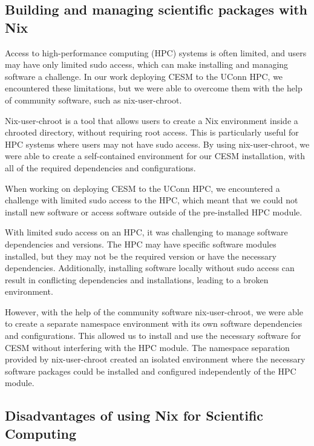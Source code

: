 \documentclass[
]{article}
\begin{document}
\hypertarget{building-and-managing-scientific-packages-with-nix}{%
\subsection{Building and managing scientific packages with Nix}\label{building-and-managing-scientific-packages-with-nix}}

Access to high-performance computing (HPC) systems is often limited, and users may have only limited sudo access, which can make installing and managing software a challenge. In our work deploying CESM to the UConn HPC, we encountered these limitations, but we were able to overcome them with the help of community software, such as nix-user-chroot.

Nix-user-chroot is a tool that allows users to create a Nix environment inside a chrooted directory, without requiring root access. This is particularly useful for HPC systems where users may not have sudo access. By using nix-user-chroot, we were able to create a self-contained environment for our CESM installation, with all of the required dependencies and configurations.

When working on deploying CESM to the UConn HPC, we encountered a challenge with limited sudo access to the HPC, which meant that we could not install new software or access software outside of the pre-installed HPC module.

With limited sudo access on an HPC, it was challenging to manage software dependencies and versions. The HPC may have specific software modules installed, but they may not be the required version or have the necessary dependencies. Additionally, installing software locally without sudo access can result in conflicting dependencies and installations, leading to a broken environment.

However, with the help of the community software nix-user-chroot, we were able to create a separate namespace environment with its own software dependencies and configurations. This allowed us to install and use the necessary software for CESM without interfering with the HPC module. The namespace separation provided by nix-user-chroot created an isolated environment where the necessary software packages could be installed and configured independently of the HPC module.

\hypertarget{disadvantages-of-using-nix-for-scientific-computing}{%
\subsection{Disadvantages of using Nix for Scientific Computing}\label{disadvantages-of-using-nix-for-scientific-computing}}
\end{document}
